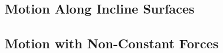\subsection{Motion Along Incline Surfaces}


\subsection{Motion with Non-Constant Forces}

%



%
%
%    
  

